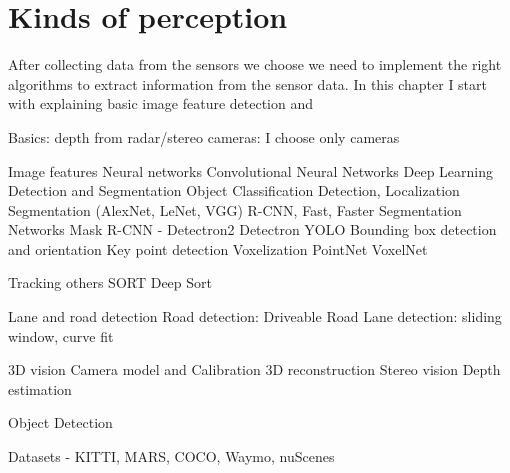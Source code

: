 \chapter{Kinds of perception}
\label{chap:perceptions}

After collecting data from the sensors we choose we need to implement the right
algorithms to extract information from the sensor data. In this chapter I start
with explaining basic image feature detection and 

Basics: depth from radar/stereo cameras: I choose only cameras

Image features
Neural networks
Convolutional Neural Networks
Deep Learning
Detection and Segmentation
    Object Classification Detection, Localization 
    Segmentation
    (AlexNet, LeNet, VGG)
    R-CNN, Fast, Faster
    Segmentation Networks
    Mask R-CNN - Detectron2
    Detectron
    YOLO
Bounding box detection and orientation
Key point detection
Voxelization        
        PointNet
        VoxelNet

Tracking
    others
    SORT
    Deep Sort

Lane and road detection
Road detection:
Driveable Road
Lane detection: sliding window, curve fit

3D vision
    Camera model and Calibration
    3D reconstruction
    Stereo vision
    Depth estimation

Object Detection

Datasets - KITTI, MARS, COCO, Waymo, nuScenes
